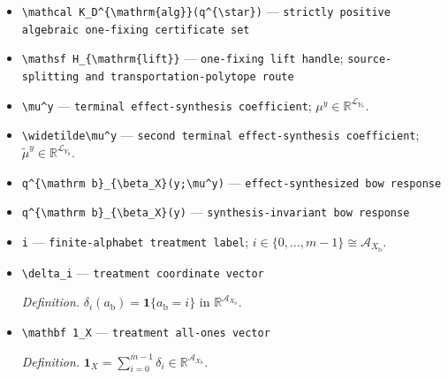 \documentclass{article}
\begin{document}
\begin{itemize}
  \item \texttt{\textbackslash{}\allowbreak{}mathcal K\_\allowbreak{}D\textasciicircum{}\{\textbackslash{}\allowbreak{}mathrm\{alg\}\allowbreak{}\}\allowbreak{}(q\textasciicircum{}\{\textbackslash{}\allowbreak{}star\}\allowbreak{})} --- \texttt{strictly positive algebraic one-\allowbreak{}fixing certificate set}
  \item \texttt{\textbackslash{}\allowbreak{}mathsf H\_\allowbreak{}\{\textbackslash{}\allowbreak{}mathrm\{lift\}\allowbreak{}\}\allowbreak{}} --- \texttt{one-\allowbreak{}fixing lift handle}; \texttt{source-\allowbreak{}splitting and transportation-\allowbreak{}polytope route}
  \item \texttt{\textbackslash{}\allowbreak{}mu\textasciicircum{}y} --- \texttt{terminal effect-\allowbreak{}synthesis coefficient}; \(\mu^y\in\mathbb R^{\mathcal L_{Y_{\mathrm b}}}\).
  \item \texttt{\textbackslash{}\allowbreak{}widetilde\textbackslash{}\allowbreak{}mu\textasciicircum{}y} --- \texttt{second terminal effect-\allowbreak{}synthesis coefficient}; \(\widetilde\mu^y\in\mathbb R^{\mathcal L_{Y_{\mathrm b}}}\).
  \item \texttt{q\textasciicircum{}\{\textbackslash{}\allowbreak{}mathrm b\}\allowbreak{}\_\allowbreak{}\{\textbackslash{}\allowbreak{}beta\_\allowbreak{}X\}\allowbreak{}(y;\allowbreak{}\textbackslash{}\allowbreak{}mu\textasciicircum{}y)} --- \texttt{effect-\allowbreak{}synthesized bow response}
  \item \texttt{q\textasciicircum{}\{\textbackslash{}\allowbreak{}mathrm b\}\allowbreak{}\_\allowbreak{}\{\textbackslash{}\allowbreak{}beta\_\allowbreak{}X\}\allowbreak{}(y)} --- \texttt{synthesis-\allowbreak{}invariant bow response}
  \item \texttt{i} --- \texttt{finite-\allowbreak{}alphabet treatment label}; \(i\in\{0,\ldots,m-1\}\cong\mathcal A_{X_{\mathrm b}}\).
  \item \texttt{\textbackslash{}\allowbreak{}delta\_\allowbreak{}i} --- \texttt{treatment coordinate vector}
  \par\smallskip\noindent\emph{Definition.} \(\delta_i(a_{\mathrm b})=\mathbf 1\{a_{\mathrm b}=i\}\) in \(\mathbb R^{\mathcal A_{X_{\mathrm b}}}\).
  \item \texttt{\textbackslash{}\allowbreak{}mathbf 1\_\allowbreak{}X} --- \texttt{treatment all-\allowbreak{}ones vector}
  \par\smallskip\noindent\emph{Definition.} \(\mathbf 1_X=\sum_{i=0}^{m-1}\delta_i\in\mathbb R^{\mathcal A_{X_{\mathrm b}}}\).

\end{itemize}
\end{document}
